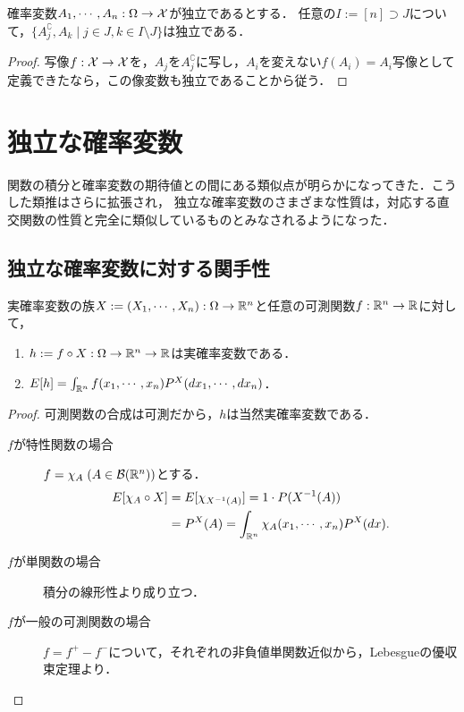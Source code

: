 \documentclass[uplatex,dvipdfmx]{jsreport}
\begin{document}
\begin{proposition}
    確率変数$A_1,\cdots,A_n:\Omega\to\mathcal{X}$が独立であるとする．
    任意の$I:=[n]\supset J$について，$\{A_j^\complement,A_k\mid j\in J,k\in I\setminus J\}$は独立である．
\end{proposition}
\begin{proof}
    写像$f:\mathcal{X}\to\mathcal{X}$を，$A_j$を$A_j^\complement$に写し，$A_i$を変えない$f(A_i)=A_i$写像として定義できたなら，この像変数も独立であることから従う．
\end{proof}

\section{独立な確率変数}

\begin{tcolorbox}[colframe=ForestGreen, colback=ForestGreen!10!white,breakable,colbacktitle=ForestGreen!40!white,coltitle=black,fonttitle=\bfseries\sffamily,
title=確率変数が独立のとき，作用素に種々の関手性が生じる]
    関数の積分と確率変数の期待値との間にある類似点が明らかになってきた．こうした類推はさらに拡張され，
    独立な確率変数のさまざまな性質は，対応する直交関数の性質と完全に類似しているものとみなされるようになった\cite{Kolmogorov}．
\end{tcolorbox}

\subsection{独立な確率変数に対する関手性}

\begin{proposition}[実空間の議論への持ち上げ]\label{prop-積関数の期待値}
    実確率変数の族$X:=(X_1,\cdots,X_n):\Omega\to\mathbb{R}^n$と任意の可測関数$f:\mathbb{R}^n\to\mathbb{R}$に対して，
    \begin{enumerate}
        \item $h:=f\circ X:\Omega\to\mathbb{R}^n\to\mathbb{R}$は実確率変数である．
        \item $E[h]=\int_{\mathbb{R}^n}f(x_1,\cdots,x_n)P^X(dx_1,\cdots,dx_n)$．
    \end{enumerate}
\end{proposition}
\begin{proof}
    可測関数の合成は可測だから，$h$は当然実確率変数である．
    \begin{description}
        \item[$f$が特性関数の場合] $f=\chi_A\;(A\in\mathcal{B}(\mathbb{R}^n))$とする．
        \begin{align*}
            E[\chi_A\circ X]&=E[\chi_{X^{-1}(A)}]=1\cdot P(X^{-1}(A))\\
            &=P^X(A)=\int_{\mathbb{R}^n}\chi_A(x_1,\cdots,x_n)P^X(dx).
        \end{align*}
        \item[$f$が単関数の場合]
        積分の線形性より成り立つ．
        \item[$f$が一般の可測関数の場合]
        $f=f^+-f^-$について，それぞれの非負値単関数近似から，Lebesgueの優収束定理より．
    \end{description}
\end{proof}
\end{document}
